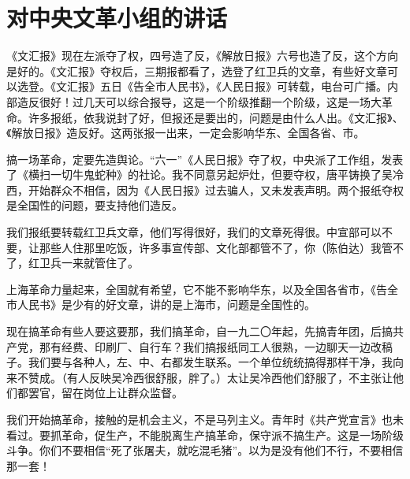 \section[对中央文革小组的讲话（一九六七年一月九日）]{对中央文革小组的讲话}


《文汇报》现在左派夺了权，四号造了反，《解放日报》六号也造了反，这个方向是好的。《文汇报》夺权后，三期报都看了，选登了红卫兵的文章，有些好文章可以选登。《文汇报》五日《告全市人民书》，《人民日报》可转载，电台可广播。内部造反很好！过几天可以综合报导，这是一个阶级推翻一个阶级，这是一场大革命。许多报纸，依我说封了好，但报还是要出的，问题是由什么人出。《文汇报》、《解放日报》造反好。这两张报一出来，一定会影响华东、全国各省、市。

搞一场革命，定要先造舆论。“六一”《人民日报》夺了权，中央派了工作组，发表了《横扫一切牛鬼蛇种》的社论。我不同意另起炉灶，但要夺权，唐平铸换了吴冷西，开始群众不相信，因为《人民日报》过去骗人，又未发表声明。两个报纸夺权是全国性的问题，要支持他们造反。

我们报纸要转载红卫兵文章，他们写得很好，我们的文章死得很。中宣部可以不要，让那些人住那里吃饭，许多事宣传部、文化部都管不了，你（陈伯达）我管不了，红卫兵一来就管住了。

上海革命力量起来，全国就有希望，它不能不影响华东，以及全国各省市，《告全市人民书》是少有的好文章，讲的是上海市，问题是全国性的。

现在搞革命有些人要这要那，我们搞革命，自一九二〇年起，先搞青年团，后搞共产党，那有经费、印刷厂、自行车？我们搞报纸同工人很熟，一边聊天一边改稿子。我们要与各种人，左、中、右都发生联系。一个单位统统搞得那样干净，我向来不赞成。（有人反映吴冷西很舒服，胖了。）太让吴冷西他们舒服了，不主张让他们都罢官，留在岗位上让群众监督。

我们开始搞革命，接触的是机会主义，不是马列主义。青年时《共产党宣言》也未看过。要抓革命，促生产，不能脱离生产搞革命，保守派不搞生产。这是一场阶级斗争。你们不要相信“死了张屠夫，就吃混毛猪”。以为是没有他们不行，不要相信那一套！

